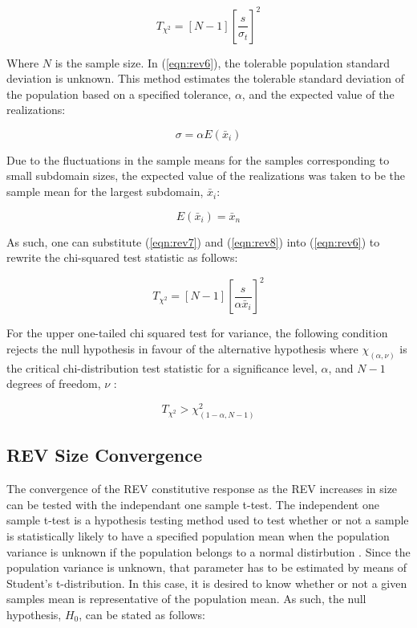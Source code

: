 \begin{equation}
T_{\chi^2}=\left[N-1\right]\left[\frac{s}{\sigma_t}\right]^2
\label{eqn:rev6}
\end{equation}

Where $N$ is the sample size. In (\ref{eqn:rev6}), the tolerable population standard deviation is unknown. This method estimates the tolerable standard deviation of the population based on a specified tolerance, $\alpha$, and the expected value of the realizations:

\begin{equation}
\sigma=\alpha E\left(\bar{x}_i\right)
\label{eqn:rev7}
\end{equation}

Due to the fluctuations in the sample means for the samples corresponding to small subdomain sizes, the expected value of the realizations was taken to be the sample mean for the largest subdomain, $\bar{x}_i$:

\begin{equation}
E\left(\bar{x}_i\right) = \bar{x}_n
\label{eqn:rev8}
\end{equation}

As such, one can substitute (\ref{eqn:rev7}) and (\ref{eqn:rev8}) into (\ref{eqn:rev6}) to rewrite the chi-squared test statistic as follows:

\begin{equation}
T_{\chi^2}=\left[N-1\right]\left[\frac{s}{\alpha \bar{x}_i}\right]^2
\label{eqn:rev9}
\end{equation}

For the upper one-tailed chi squared test for variance, the following condition rejects the null hypothesis in favour of the alternative hypothesis where $\chi_{\left(\alpha, \nu\right)}$ is the critical chi-distribution test statistic for a significance level, $\alpha$, and $N-1$ degrees of freedom, $\nu$ \citep{walpole_probability_2007}:

\begin{equation}
T_{\chi^2}>\chi^2_{\left(1-\alpha, N-1\right)}
\label{eqn:rev10}
\end{equation}

\subsection{REV Size Convergence}

The convergence of the REV constitutive response as the REV increases in size can be tested with the independant one sample t-test. The independent one sample t-test is a hypothesis testing method used to test whether or not a sample is statistically likely to have a specified population mean when the population variance is unknown if the population belongs to a normal distirbution \citep{walpole_probability_2007}. Since the population variance is unknown, that parameter has to be estimated by means of Student’s t-distribution. In this case, it is desired to know whether or not a given samples mean is representative of the population mean. As such, the null hypothesis, $H_0$, can be stated as follows:

